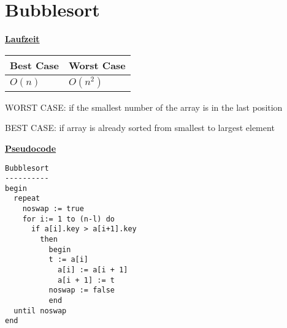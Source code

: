 \documentclass[a4paper]{report}
\begin{document}
\chapter*{Bubblesort}

\underline{\bf{Laufzeit}}

\begin{tabular}{|l|l|}
\hline
Best Case & Worst Case \\ \hline
$O(n) $     & $O(n^2)$ \\ \hline
\end{tabular}

WORST CASE: if the smallest number of the array is in the last position



BEST CASE: if array is already sorted from smallest to largest element

\underline{\bf{Pseudocode}}

\begin{lstlisting}
Bubblesort
----------
begin 
  repeat
    noswap := true
    for i:= 1 to (n-l) do
      if a[i].key > a[i+1].key
      	then
      	  begin
      	  t := a[i]
            a[i] := a[i + 1]
            a[i + 1] := t
          noswap := false
          end
  until noswap
end
\end{lstlisting}
\end{document}

